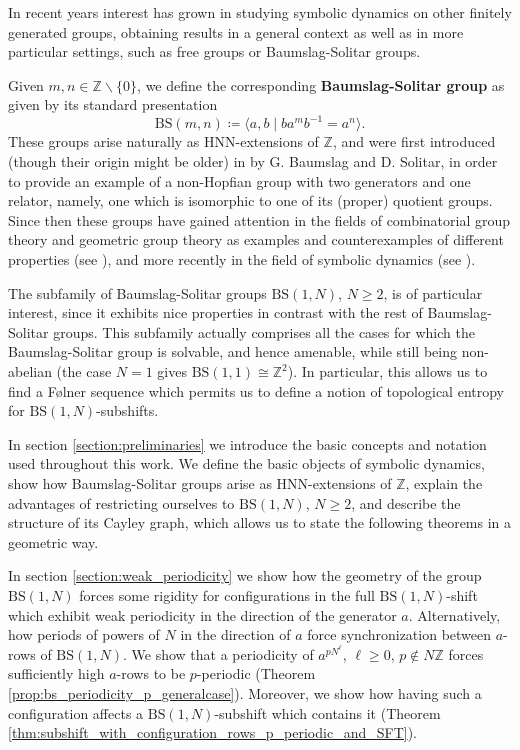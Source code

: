 \documentclass[letterpaper,10pt]{amsart}
\theoremstyle{plain}
\newcommand{\BS}[1][N]{\mathrm{BS}(1,#1)}
\begin{document}
In recent years interest has grown in studying symbolic dynamics on other finitely generated groups, obtaining results in a general context as well as in more particular settings, such as free groups or Baumslag-Solitar groups.

Given $m,n\in \mathbb{Z}\backslash \{0\}$, we define the corresponding \textbf{Baumslag-Solitar group} as given by its standard presentation
$$
\mathrm{BS}(m,n)\coloneqq \langle a,b \mid ba^mb^{-1}=a^n \rangle.
$$
These groups arise naturally as HNN-extensions of $\mathbb{Z}$, and were first introduced (though their origin might be older) in \cite{baumslag_solitar_1962} by G. Baumslag and D. Solitar, in order to provide an example of a non-Hopfian group with two generators and one relator, namely, one which is isomorphic to one of its (proper) quotient groups. Since then these groups have gained attention in the fields of combinatorial group theory and geometric group theory as examples and counterexamples of different properties (see \cite{harpe_2003,meskin_1972}), and more recently in the field of symbolic dynamics (see \cite{aubrun_kari_2013,cyr2016distortion,esnay2020weakly}).

The subfamily of Baumslag-Solitar groups $\BS$, $N\ge 2$, is of particular interest, since it exhibits nice properties in contrast with the rest of Baumslag-Solitar groups. This subfamily actually comprises all the cases for which the Baumslag-Solitar group is solvable, and hence amenable, while still being non-abelian (the case $N=1$ gives $\mathrm{BS}(1,1)\cong \mathbb{Z}^2$). In particular, this allows us to find a F\o lner sequence which permits us to define a notion of topological entropy for $\BS$-subshifts. 

In section \ref{section:preliminaries} we introduce the basic concepts and notation used throughout this work. We define the basic objects of symbolic dynamics, show how Baumslag-Solitar groups arise as HNN-extensions of $\mathbb{Z}$, explain the advantages of restricting ourselves to $\BS$, $N\ge 2$, and describe the structure of its Cayley graph, which allows us to state the following theorems in a geometric way.
	
	In section \ref{section:weak_periodicity} we show how the geometry of the group $\BS$ forces some rigidity for configurations in the full $\BS$-shift which exhibit weak periodicity in the direction of the generator $a$. Alternatively, how periods of powers of $N$ in the direction of $a$ force synchronization between $a$-rows of $\BS$. We show that a periodicity of $a^{pN^\ell}$, $\ell\ge 0$, $p\notin N\mathbb{Z}$ forces sufficiently high $a$-rows to be $p$-periodic (Theorem \ref{prop:bs_periodicity_p_generalcase}). Moreover, we show how having such a configuration affects a $\BS$-subshift which contains it (Theorem \ref{thm:subshift_with_configuration_rows_p_periodic_and_SFT}).
\end{document}
